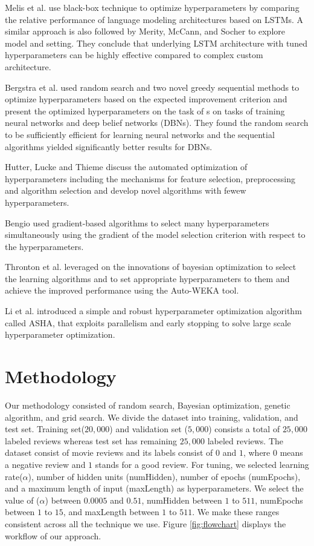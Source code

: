 \documentclass[conference]{IEEEtran}
\begin{document}
Melis et al.\cite{melis} use  black-box technique\cite{blackbox} to optimize hyperparameters  by comparing the relative performance of language modeling architectures based on LSTMs. A similar approach is also followed by Merity, McCann, and Socher \cite{merita} to explore model and setting. They conclude that underlying LSTM architecture with tuned hyperparameters can be highly effective compared to complex custom architecture.

Bergstra et al.\cite{methods} used random search and two novel greedy sequential methods to optimize hyperparameters based on the expected improvement criterion and present the optimized hyperparameters on the task of s on tasks of training neural networks and deep belief networks (DBNs). They found the random search to be sufficiently efficient for learning neural networks and the sequential algorithms yielded significantly better results for DBNs.

Hutter, Lucke and Thieme \cite{hutter} discuss the automated optimization of hyperparameters including the mechanisms for feature selection, preprocessing and algorithm selection and develop novel algorithms with fewew hyperparameters.

Bengio used gradient-based algorithms to select many hyperparameters simultaneously using the gradient of the model selection criterion with respect to the hyperparameters\cite{bengio}.

Thronton et al.\cite{weka} leveraged on the innovations of bayesian optimization to select the learning algorithms and to set appropriate hyperparameters to them and achieve the improved performance using the Auto-WEKA tool.

Li et al. \cite{asha} introduced a simple and robust hyperparameter optimization algorithm called ASHA, that exploits parallelism and early stopping to solve large scale hyperparameter optimization.

\section{Methodology}

Our methodology consisted of random search, Bayesian optimization, genetic algorithm, and grid search. We divide the dataset into training, validation, and test set. Training set($20,000$) and validation set ($5,000$) consists a total of $25,000$ labeled reviews whereas test set has remaining $25,000$ labeled reviews. The dataset consist of movie reviews and its labels consist of $0$ and $1$, where $0$ means a negative review and $1$ stands for a good review. For tuning, we selected learning rate($\alpha$), number of hidden units (numHidden), number of epochs (numEpochs), and a maximum length of input (maxLength) as hyperparameters. We select the value of ($\alpha$) between $0.0005$ and $0.51$, numHidden between $1$ to $511$, numEpochs between $1$ to $15$,  and maxLength between $1$ to $511$. We make these ranges consistent across all the technique we use. Figure \ref{fig:flowchart} displays the workflow of our approach.
\end{document}
